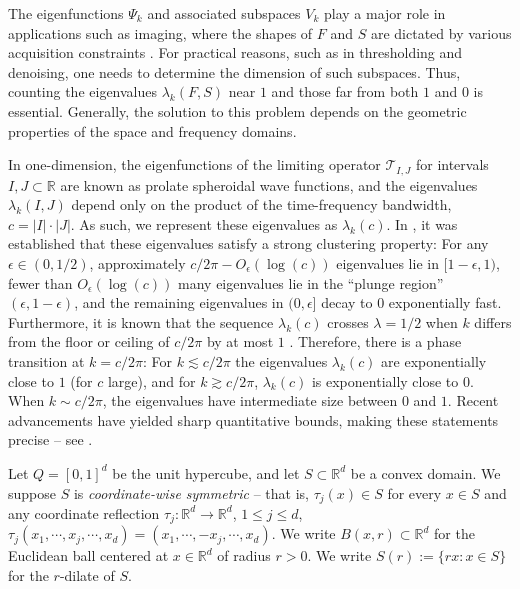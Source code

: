 \documentclass[conference]{IEEEtran}
\def\R{\mathbb{R}}
\numberwithin{equation}{section}
\def\R{\mathbb{R}}
\begin{document}
The eigenfunctions $\Psi_k$  and associated subspaces $V_k$ play a major role in applications such as imaging, where the shapes of $F$ and $S$ are dictated by various acquisition constraints \cite{Bell1,Bell2,Bell3,Bell4,Bell5}.  
For practical reasons, such as in thresholding and denoising, one needs to determine the dimension of such subspaces.  Thus, counting the eigenvalues \(\lambda_k(F,S)\) near $1$ and those far from both $1$ and $0$ is essential.
Generally, the solution to this problem depends on the geometric properties of the space and frequency domains.

In one-dimension, the eigenfunctions of the limiting operator $\mathcal{T}_{I,J}$ for intervals $I,J \subset \R$ are known as prolate spheroidal wave  functions,
and the eigenvalues $\lambda_k(I,J)$ depend only on the product of the time-frequency bandwidth, $c = |I| \cdot |J|$. 
As such, we represent these eigenvalues as $\lambda_k(c)$.
In \cite{Bell1,Bell2,Bell3}, it was established that these eigenvalues satisfy a strong clustering property: 
For any $\epsilon \in (0,1/2)$, 
approximately $c/2\pi - O_\epsilon(\log(c))$ eigenvalues lie in $[1-\epsilon, 1)$, 
fewer than $O_\epsilon(\log(c))$ many eigenvalues lie in the ``plunge region'' $(\epsilon ,1 - \epsilon) $,
and the remaining eigenvalues in $(0,\epsilon]$ decay to $0$ exponentially fast. 
Furthermore, it is known that the sequence $\lambda_k(c)$ crosses $\lambda=1/2$ when $k$ differs from the floor or ceiling of $c/2\pi$ by at most $1$ \cite{Landau93}. Therefore, there is a phase transition at $k = c/2\pi$: For $k\lesssim c/2\pi$ the eigenvalues $\lambda_k(c)$ are exponentially close to $1$ (for $c$ large), and for $k \gtrsim c/2\pi$, $\lambda_k(c)$ is exponentially close to $0$. When $k \sim c/2\pi$, the eigenvalues have intermediate size between $0$ and $1$. Recent advancements have yielded sharp quantitative bounds, making these statements precise -- see \cite{israel15eigenvalue,osipov2013,davenport2021improved, Bonami21, Kulikov24}.

Let $Q = [0,1]^d$ be the unit hypercube, and let $S\subset \R^d$ be a convex domain. We suppose $S$ is \emph{coordinate-wise symmetric} -- that is,  $\tau_j(x) \in S$ for every $x \in S$ and any coordinate reflection $\tau_j : \R^d \rightarrow \R^d$, $1 \leq j \leq d$, $\tau_j(x_1,\cdots,x_j,\cdots, x_d) = (x_1,\cdots,-x_j,\cdots,x_d)$. 
% 
We write $B(x,r) \subset \R^d$ for the Euclidean ball centered at $x \in \R^d$ of radius $r > 0$. We write $S(r) := \{ rx : x \in S\}$ for the $r$-dilate of $S$.
\end{document}
